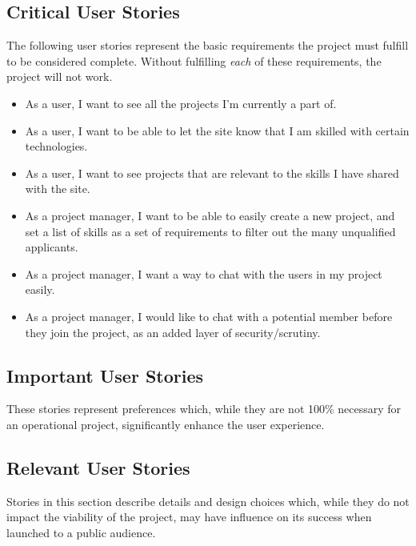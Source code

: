 \documentclass[a4paper, 12pt]{article}
\begin{document}
	\subsection{Critical User Stories}
		The following user stories represent the basic requirements the project must fulfill to be considered complete. Without fulfilling \textit{each} of these requirements, the project will not work.
		\begin{itemize}
			\item As a user, I want to see all the projects I'm currently a part of.
			\item As a user, I want to be able to let the site know that I am skilled with certain technologies.
			\item As a user, I want to see projects that are relevant to the skills I have shared with the site.
			\item As a project manager, I want to be able to easily create a new project, and set a list of skills as a set of requirements to filter out the many unqualified applicants.
			\item As a project manager, I want a way to chat with the users in my project easily.
			\item As a project manager, I would like to chat with a potential member before they join the project, as an added layer of security/scrutiny.
		\end{itemize}
		
	\subsection{Important User Stories}
		These stories represent preferences which, while they are not 100\% necessary for an operational project, significantly enhance the user experience.
		\begin{itemize}
		
		\end{itemize}
	
	\subsection{Relevant User Stories}
		Stories in this section describe details and design choices which, while they do not impact the viability of the project, may have influence on its success when launched to a public audience.
		\begin{itemize}
		
		\end{itemize}
\end{document}
